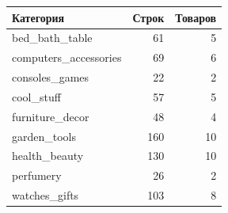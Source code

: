 \begin{tabular}{lrr}
\toprule
Категория & Строк & Товаров \\
\midrule
bed\_bath\_table & 61 & 5 \\
computers\_accessories & 69 & 6 \\
consoles\_games & 22 & 2 \\
cool\_stuff & 57 & 5 \\
furniture\_decor & 48 & 4 \\
garden\_tools & 160 & 10 \\
health\_beauty & 130 & 10 \\
perfumery & 26 & 2 \\
watches\_gifts & 103 & 8 \\
\bottomrule
\end{tabular}
